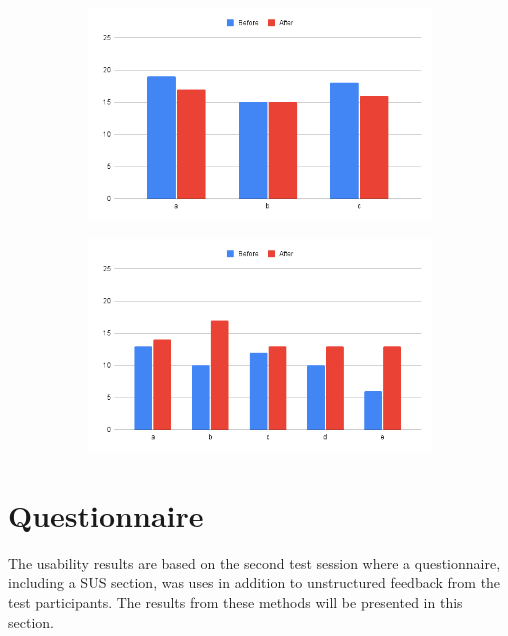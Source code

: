 \begin{figure}[H]
    \centering
    \begin{subfigure}[t]{0.8\textwidth}
        \includegraphics[width=\textwidth]{fig/knowtestresult1}
        \caption{}
    \end{subfigure}
    \begin{subfigure}[b]{0.8\textwidth}
        \includegraphics[width=\textwidth]{fig/knowtestresult2}
        \caption{}
    \end{subfigure}
\end{figure}





\section{Questionnaire}

The usability results are based on the second test session where a questionnaire, including a SUS section, was uses in addition to unstructured feedback from the test participants. The results from these methods will be presented in this section. 

